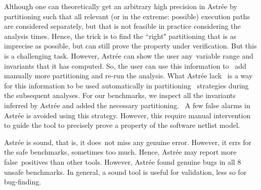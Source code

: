Although one can theoretically get an arbitrary high precision in Astr{\'e}e by 
partitioning such that all relevant (or in the extreme: possible) execution 
paths are considered separately, but that is not feasible in practice considering 
the analysis times. Hence, the trick is to find the ``right" partitioning that 
is as imprecise as possible, but can still prove the property under verification. 
But this is a challenging task.  
However, Astr{\'e}e can show the user any variable range and invariants that 
it has computed.  So, the user can use this information to  
add manually more partitioning and re-run the analysis. What Astr{\'e}e lack  
is a way for this information to be used automatically in partitioning  
strategies during the subsequent analyses.  For our benchmarks, 
we inspect all the invariants inferred by Astr{\'e}e and added the 
necessary partitioning.  A few false alarms in Astr{\'e}e is avoided 
using this strategy.  However, this require manual intervention to 
guide the tool to precisely prove a property of the software netlist model.





%
Astr{\'e}e is sound, that is, it does not miss any genuine error. 
However, it errs for the safe benchmarks, sometimes too much. Hence, Astr{\'e}e 
may report more false positives than other tools. However, Astr{\'e}e 
found genuine bugs in all 8 unsafe benchmarks.
In general, a sound tool is useful for validation, less so for 
bug-finding.


